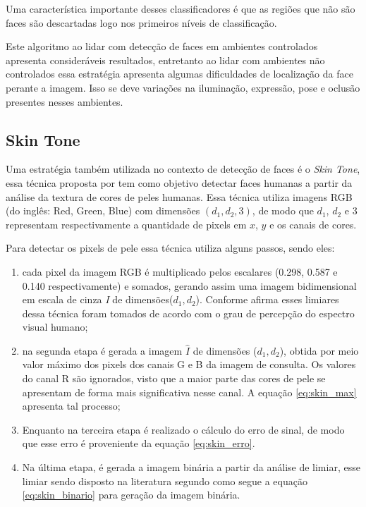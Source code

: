 Uma característica importante desses classificadores é que as regiões que não são faces são descartadas logo nos primeiros níveis de classificação. 

Este algoritmo ao lidar com detecção de faces em ambientes controlados apresenta consideráveis resultados, entretanto ao lidar com ambientes não controlados essa estratégia apresenta algumas dificuldades de localização da face perante a imagem. Isso se deve variações na iluminação, expressão, pose e oclusão presentes nesses ambientes.



\subsection{Skin Tone}
\label{sub:skin}

Uma estratégia também utilizada no contexto de detecção de faces é o \textit{Skin Tone}, essa técnica proposta por  tem como objetivo detectar faces humanas a partir da análise da textura de cores de peles humanas. Essa técnica utiliza imagens RGB (do inglês: Red, Green, Blue) com dimensões $(d_1, d_2, 3)$, de modo que $d_1$, $d_2$ e 3 representam respectivamente a quantidade de pixels em $x$, $y$ e os canais de cores.


Para detectar os pixels de pele essa técnica utiliza alguns passos, sendo eles: 

\begin{enumerate}
\item cada pixel da imagem RGB é multiplicado pelos escalares (0.298, 0.587 e 0.140 respectivamente) e somados, gerando assim uma imagem bidimensional em escala de cinza \textit{I} de dimensões($d_1,d_2$). Conforme afirma  esses limiares dessa técnica foram tomados de acordo com o grau de percepção do espectro visual humano;
 
\item na segunda etapa é gerada a imagem $\hat{I}$ de dimensões ($d_1,d_2$), obtida por meio valor máximo dos pixels dos canais G e B da imagem de consulta. Os valores do canal R são ignorados, visto que a maior parte das cores de pele se apresentam de forma mais significativa nesse canal. A equação \ref{eq:skin_max} apresenta tal processo;

\item Enquanto na terceira etapa  é realizado o cálculo do erro de sinal, de modo que esse erro é proveniente da equação \ref{eq:skin_erro}.

\item Na última etapa, é gerada a imagem binária a partir da análise de limiar, esse limiar sendo disposto na literatura segundo  como segue a equação \ref{eq:skin_binario} para geração da imagem binária.
  
\end{enumerate}



